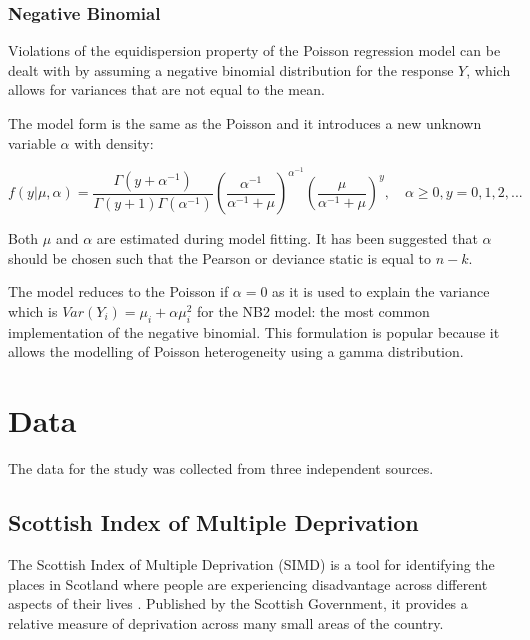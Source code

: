 \documentclass{thesis}
\begin{document}
\subsection{Negative Binomial}

Violations of the equidispersion property of the Poisson regression model can be dealt with by assuming a negative binomial distribution for the response $Y$, which allows for variances that are not equal to the mean.

The model form is the same as the Poisson and it introduces a new unknown variable $\alpha$ with density:

\begin{equation}
    f(y|\mu,\alpha) = \frac{\Gamma(y + \alpha^{-1})}{\Gamma(y+1)\Gamma(\alpha^{-1})}(\frac{\alpha^{-1}}{\alpha^{-1} + \mu})^{\alpha^{-1}}(\frac{\mu}{\alpha^{-1} + \mu})^y,\hspace{1em}\alpha\ge 0, y=0,1,2,...
\end{equation}

Both $\mu$ and $\alpha$ are estimated during model fitting. It has been suggested that $\alpha$ should be chosen such that the Pearson or deviance static is equal to $n - k$\cite{cameron_trivedi_2013}.

The model reduces to the Poisson if $\alpha = 0$ as it is used to explain the variance which is $Var(Y_i) = \mu_i + \alpha\mu_i^2$ for the NB2 model: the most common implementation of the negative binomial\cite{cameron_trivedi_2013}. This formulation is popular because it allows the modelling of Poisson heterogeneity using a gamma distribution\cite{ncss-neg-bin}.


\chapter{Data} \label{chapter:data}

The data for the study was collected from three independent sources.

\section{Scottish Index of Multiple Deprivation}

The Scottish Index of Multiple Deprivation (SIMD) is a tool for identifying the places in Scotland where people are experiencing disadvantage across different aspects of their lives \cite{simd}. Published by the Scottish Government, it provides a relative measure of deprivation across many small areas of the country.
\end{document}
